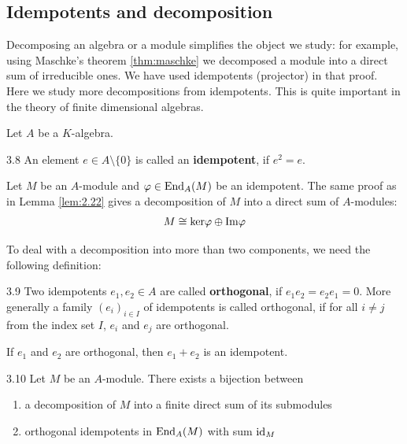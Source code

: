 \documentclass[twoside = false,	%
		headsepline,		%
		parskip = true,
		]{scrbook}						%
\begin{document}
\subsection{Idempotents and decomposition}
    Decomposing an algebra or a module simplifies the object we study: for example, using Maschke's theorem \ref{thm:maschke} we decomposed a module into a direct sum of irreducible ones. We have used idempotents (projector) in that proof. Here we study more decompositions from idempotents. This is quite important in the theory of finite dimensional algebras.

    Let $A$ be a $K$-algebra.

    \begin{definition}{}{3.8}
        An element $e \in A \setminus \{0\}$ is called an \textbf{idempotent}, if $e^2 = e$.
    \end{definition}

    Let $M$ be an $A$-module and $\varphi \in \mathrm{End}_A(M)$ be an idempotent. The same proof as in Lemma \ref{lem:2.22} gives a decomposition of $M$ into a direct sum of $A$-modules:
    \begin{equation*}
        M \cong \mathrm{ker} \varphi \oplus \mathrm{Im} \varphi
    \end{equation*}

    To deal with a decomposition into more than two components, we need the following definition:

    \begin{definition}{}{3.9}
        Two idempotents $e_1,e_2 \in A$ are called \textbf{orthogonal}, if $e_1e_2 = e_2 e_1 = 0$. More generally a family $(e_i)_{i \in I}$ of idempotents is called orthogonal, if for all $i \neq j$ from the index set $I$, $e_i$ and $e_j$ are orthogonal. 
    \end{definition}

    If $e_1$ and $e_2$ are orthogonal, then $e_1 + e_2$ is an idempotent.

    \begin{proposition}{}{3.10}
        Let $M$ be an $A$-module. There exists a bijection between
        \begin{enumerate}
            \item a decomposition of $M$ into a finite direct sum of its submodules
            \item orthogonal idempotents in $\mathrm{End}_A(M)$ with sum $\mathrm{id}_M$
        \end{enumerate}
    \end{proposition}
\end{document}

